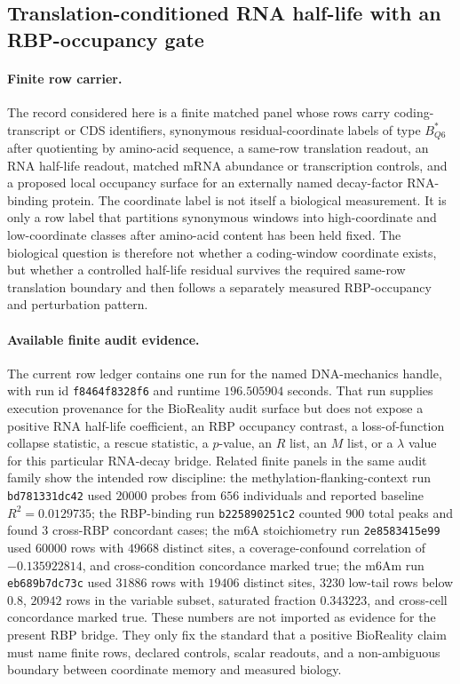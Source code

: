 
\subsection{Translation-conditioned RNA half-life with an RBP-occupancy gate}
\label{sec:bioreality-q6-translation-conditioned-rna-half-life-rbp-bridge}

\paragraph{Finite row carrier.}
The record considered here is a finite matched panel whose rows carry coding-transcript or CDS identifiers, synonymous residual-coordinate labels of type $B^*_{Q6}$ after quotienting by amino-acid sequence, a same-row translation readout, an RNA half-life readout, matched mRNA abundance or transcription controls, and a proposed local occupancy surface for an externally named decay-factor RNA-binding protein. The coordinate label is not itself a biological measurement. It is only a row label that partitions synonymous windows into high-coordinate and low-coordinate classes after amino-acid content has been held fixed. The biological question is therefore not whether a coding-window coordinate exists, but whether a controlled half-life residual survives the required same-row translation boundary and then follows a separately measured RBP-occupancy and perturbation pattern.

\paragraph{Available finite audit evidence.}
The current row ledger contains one run for the named DNA-mechanics handle, with run id \texttt{f8464f8328f6} and runtime $196.505904$ seconds. That run supplies execution provenance for the BioReality audit surface but does not expose a positive RNA half-life coefficient, an RBP occupancy contrast, a loss-of-function collapse statistic, a rescue statistic, a $p$-value, an $R$ list, an $M$ list, or a $\lambda$ value for this particular RNA-decay bridge. Related finite panels in the same audit family show the intended row discipline: the methylation-flanking-context run \texttt{bd781331dc42} used $20000$ probes from $656$ individuals and reported baseline $R^2=0.0129735$; the RBP-binding run \texttt{b225890251c2} counted $900$ total peaks and found $3$ cross-RBP concordant cases; the m6A stoichiometry run \texttt{2e8583415e99} used $60000$ rows with $49668$ distinct sites, a coverage-confound correlation of $-0.135922814$, and cross-condition concordance marked true; the m6Am run \texttt{eb689b7dc73c} used $31886$ rows with $19406$ distinct sites, $3230$ low-tail rows below $0.8$, $20942$ rows in the variable subset, saturated fraction $0.343223$, and cross-cell concordance marked true. These numbers are not imported as evidence for the present RBP bridge. They only fix the standard that a positive BioReality claim must name finite rows, declared controls, scalar readouts, and a non-ambiguous boundary between coordinate memory and measured biology.

